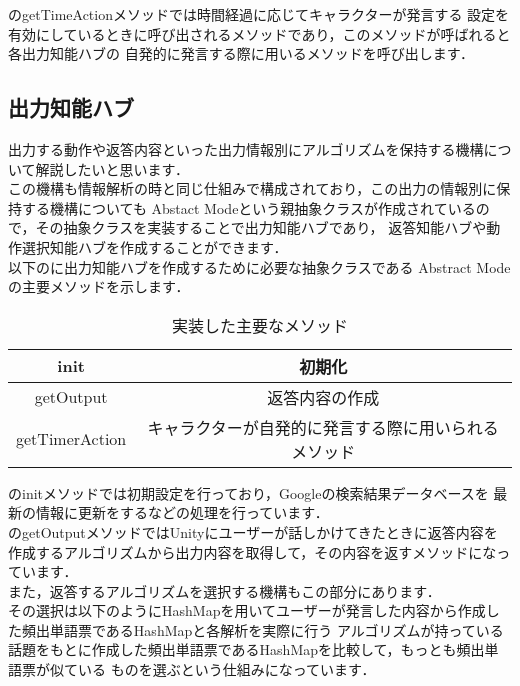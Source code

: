 のgetTimeActionメソッドでは時間経過に応じてキャラクターが発言する
設定を有効にしているときに呼び出されるメソッドであり，このメソッドが呼ばれると各出力知能ハブの
自発的に発言する際に用いるメソッドを呼び出します．\\



\subsection{出力知能ハブ}
出力する動作や返答内容といった出力情報別にアルゴリズムを保持する機構について解説したいと思います．\\

この機構も情報解析の時と同じ仕組みで構成されており，この出力の情報別に保持する機構についても
Abstact Modeという親抽象クラスが作成されているので，その抽象クラスを実装することで出力知能ハブであり，
返答知能ハブや動作選択知能ハブを作成することができます．
\\
以下のに出力知能ハブを作成するために必要な抽象クラスである
Abstract Modeの主要メソッドを示します．\\

\begin{table}[tbh]
	\caption{実装した主要なメソッド} \label{tab:abstractmode}
	\begin{center}
		\begin{tabular}[htb]{c|c}
		\hline
		init & 初期化 \\
		\hline
		getOutput & 返答内容の作成 \\
		\hline
		getTimerAction & キャラクターが自発的に発言する際に用いられるメソッド \\
		\hline
		\end{tabular}
	\end{center}
\end{table}

のinitメソッドでは初期設定を行っており，Googleの検索結果データベースを
最新の情報に更新をするなどの処理を行っています．\\

のgetOutputメソッドではUnityにユーザーが話しかけてきたときに返答内容を
作成するアルゴリズムから出力内容を取得して，その内容を返すメソッドになっています．\\
また，返答するアルゴリズムを選択する機構もこの部分にあります．
\\
その選択は以下のようにHashMapを用いてユーザーが発言した内容から作成した頻出単語票であるHashMapと各解析を実際に行う
アルゴリズムが持っている話題をもとに作成した頻出単語票であるHashMapを比較して，もっとも頻出単語票が似ている
ものを選ぶという仕組みになっています．\\

